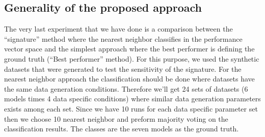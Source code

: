 \subsection{Generality of the proposed approach}
\label{Classification}

The very last experiment that we have done is a comparison between the ``signature'' method where the nearest neighbor classifies in the performance vector space and the simplest approach where the best performer is defining the ground truth (``Best performer'' method). For this purpose, we used the synthetic datasets that were generated to test the sensitivity of the signature. For the nearest neighbor approach the classification should be done where datasets have the same data generation conditions. Therefore we'll get 24 sets of datasets (6 models times 4 data specific conditions) where similar data generation parameters exists among each set. Since we have 10 runs for each data specific parameter set then we choose 10 nearest neighbor and preform majority voting on the classification results. The classes are the seven models as the ground truth.


